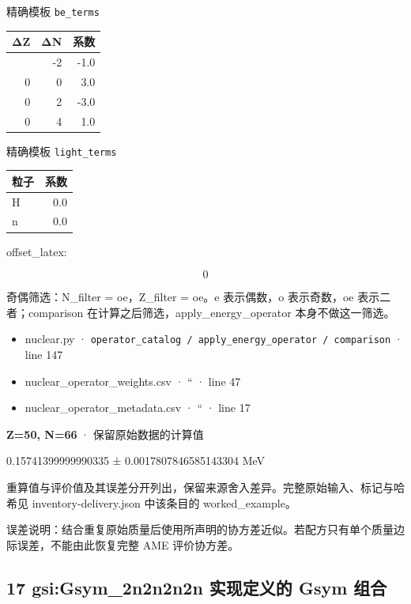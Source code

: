 \documentclass[
  11pt,
  letterpaper,
]{article}
\providecommand{\tightlist}{%
  \setlength{\itemsep}{0pt}\setlength{\parskip}{0pt}}
\begin{document}
精确模板 \texttt{be\_terms}

\begin{longtable}[]{@{}rrr@{}}
\toprule\noalign{}
ΔZ & ΔN & 系数 \\
\midrule\noalign{}
\endhead
\bottomrule\noalign{}
\endlastfoot
0 & -2 & -1.0 \\
0 & 0 & 3.0 \\
0 & 2 & -3.0 \\
0 & 4 & 1.0 \\
\end{longtable}

精确模板 \texttt{light\_terms}

\begin{longtable}[]{@{}lr@{}}
\toprule\noalign{}
粒子 & 系数 \\
\midrule\noalign{}
\endhead
\bottomrule\noalign{}
\endlastfoot
H & 0.0 \\
n & 0.0 \\
\end{longtable}

offset\_latex:

\[
0
\]

奇偶筛选：N\_filter = oe，Z\_filter = oe。e 表示偶数，o 表示奇数，oe
表示二者；comparison 在计算之后筛选，apply\_energy\_operator
本身不做这一筛选。

\begin{itemize}
\tightlist
\item
  nuclear.py ·
  \texttt{operator\_catalog\ /\ apply\_energy\_operator\ /\ comparison}
  · line 147
\item
  nuclear\_operator\_weights.csv · `` · line 47
\item
  nuclear\_operator\_metadata.csv · `` · line 17
\end{itemize}

\textbf{Z=50, N=66} · 保留原始数据的计算值

0.15741399999990335 ± 0.0017807846585143304 MeV

重算值与评价值及其误差分开列出，保留来源舍入差异。完整原始输入、标记与哈希见
inventory-delivery.json 中该条目的 worked\_example。

误差说明：结合重复原始质量后使用所声明的协方差近似。若配方只有单个质量边际误差，不能由此恢复完整
AME 评价协方差。

\subsection{17 gsi:Gsym\_2n2n2n2n 实现定义的 Gsym
组合}\label{gsigsym_2n2n2n2n-ux5b9eux73b0ux5b9aux4e49ux7684-gsym-ux7ec4ux5408}
\end{document}
